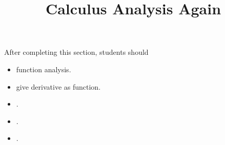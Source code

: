 \documentclass{ximera}
\title{Calculus Analysis Again}
\begin{document}
\begin{abstract}
\end{abstract}
\maketitle

\begin{sectionOutcomes}
After completing this section, students should 

\begin{itemize}
\item function analysis.
\item give derivative as function.
\item .
\item .
\item .
\end{itemize}
\end{sectionOutcomes}
\end{document}
